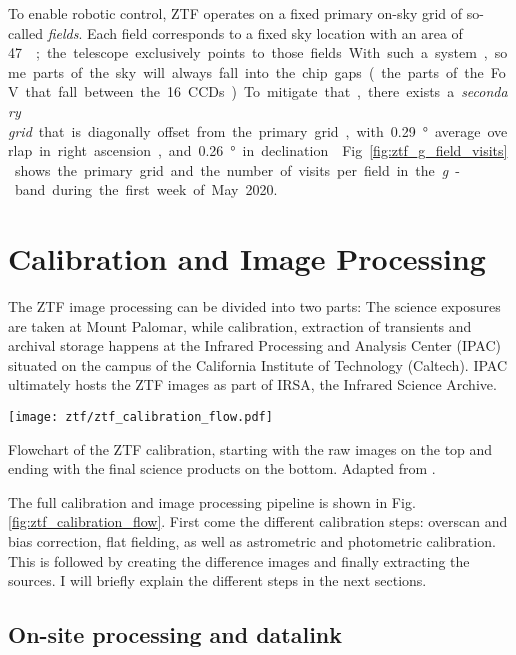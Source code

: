 To enable robotic control, ZTF operates on a fixed primary on-sky grid of so-called \textit{fields}. Each field corresponds to a fixed sky location with an area of \SI{47}{\square\deg}; the telescope exclusively points to those fields. With such a system, some parts of the sky will always fall into the chip gaps (the parts of the FoV that fall between the 16 CCDs). To mitigate that, there exists a \textit{secondary grid} that is diagonally offset from the primary grid, with \SI{0.29}{\degree} average overlap in right ascension, and \SI{0.26}{\degree} in declination . Fig. \ref{fig:ztf_g_field_visits} shows the primary grid and the number of visits per field in the \textit{g}-band during the first week of May 2020.

\section{Calibration and Image Processing}
The ZTF image processing can be divided into two parts: The science exposures are taken at Mount Palomar, while calibration, extraction of transients and archival storage happens at the Infrared Processing and Analysis Center (IPAC) situated on the campus of the California Institute of Technology (Caltech). IPAC ultimately hosts the ZTF images as part of IRSA, the Infrared Science Archive.

\begin{marginfigure}
    \texttt{[image: ztf/ztf\_calibration\_flow.pdf]}
    \caption[ZTF realtime flowchart]{Flowchart of the ZTF calibration, starting with the raw images on the top and ending with the final science products on the bottom. Adapted from \cite{Laher2018}.}
\end{marginfigure}

The full calibration and image processing pipeline is shown in Fig. \ref{fig:ztf_calibration_flow}. First come the different calibration steps: overscan and bias correction, flat fielding, as well as astrometric and photometric calibration. This is followed by creating the difference images and finally extracting the sources. I will briefly explain the different steps in the next sections.

\subsection{On-site processing and datalink}\label{ztf_data_link}

